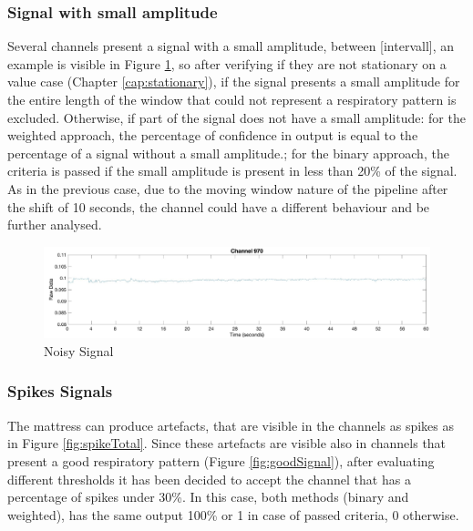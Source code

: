 \subsubsection*{Signal with small amplitude}\label{cap:noisy}

Several channels present a signal with a small amplitude, between [intervall], an example is visible in Figure \ref{fig:noisy}, so after verifying if they are not stationary on a value case (Chapter \ref{cap:stationary}), if the signal presents a small amplitude for the entire length of the window that could not represent a respiratory pattern is excluded. 
Otherwise, if part of the signal does not have a small amplitude: for the weighted approach, the percentage of confidence in output is equal to the percentage of a signal without a small amplitude.; for the binary approach, the criteria is passed if the small amplitude is present in less than 20\% of the signal.
As in the previous case, due to the moving window nature of the pipeline after the shift of 10 seconds, the channel could have a different behaviour and be further analysed.\\


\begin{figure}[H]
    \centering
    \includegraphics[width=\textwidth]{img/noisy.jpg}
    \caption{Noisy Signal}
    \label{fig:noisy}
\end{figure}


\subsubsection{Spikes Signals} \label{spikes}
The mattress can produce artefacts, that are visible in the channels as spikes as in Figure \ref{fig:spikeTotal}. 
Since these artefacts are visible also in channels that present a good respiratory pattern (Figure \ref{fig:goodSignal}), after evaluating different thresholds it has been decided to accept the channel that has a percentage of spikes under 30\%. In this case, both methods (binary and weighted), has the same output 100\% or 1 in case of passed criteria, 0 otherwise.\\


